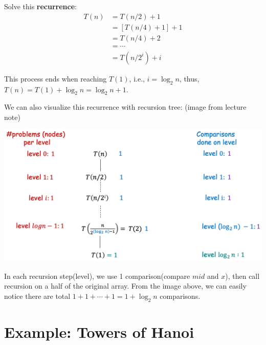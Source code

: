 \begin{spacing}{1.3}
    Solve this {\bf recurrence}:
    \begin{align*}
        T(n) &= T(n/2) + 1\\
            &= [T(n/4) + 1] + 1\\
            &= T(n/4) + 2\\
            &=\cdots\\
            &=T(n/2^{i}) + i
    \end{align*}

    This process ends when reaching $T(1)$, i.e., 
    $i=\log_2 n$, thus, $T(n)=T(1)+\log_2 n=\log_2 n + 1$.

    We can also visualize this recurrence with recursion tree:
    (image from lecture note)
    \begin{center}
        \includegraphics[scale=0.42]{images/02-bs-tree.png}
    \end{center}

    In each recursion step(level), we use 1 comparison(compare 
    $mid$ and $x$), then call recursion on a half 
    of the original array. From the image above, 
    we can easily notice there are total 
    $1+1+\cdots+1=1+\log_2 n$ comparisons.

    \newpage
    \section{Example: Towers of Hanoi}


\end{spacing}
